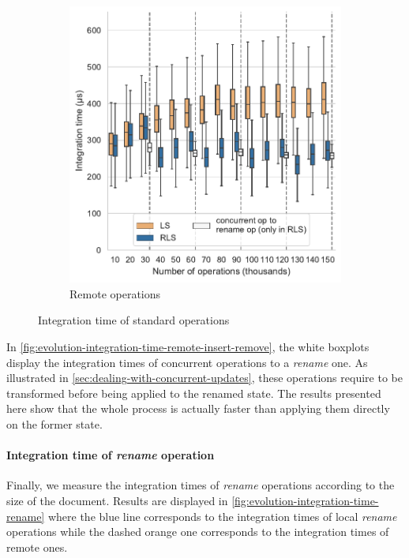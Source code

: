 \documentclass[sigplan,10pt,authorversion]{acmart}
\begin{document}
\begin{figure}[ht!]
\begin{subfigure}{\columnwidth}
        \includegraphics[width=0.9\columnwidth]{img/integration-time-boxplot-remote-operations-without-outliers.pdf}
        \caption{Remote operations}
        \label{fig:evolution-integration-time-remote-insert-remove}
    \end{subfigure}
    \caption{Integration time of standard operations}
    \label{fig:evolution-integration-time-insert-remove}
\end{figure}

In \autoref{fig:evolution-integration-time-remote-insert-remove}, the white boxplots display the integration times of concurrent operations to a \emph{rename} one.
As illustrated in \autoref{sec:dealing-with-concurrent-updates}, these operations require to be transformed before being applied to the renamed state.
The results presented here show that the whole process is actually faster than applying them directly on the former state.

\paragraph{Integration time of \emph{rename} operation}

Finally, we measure the integration times of \emph{rename} operations according to the size of the document.
Results are displayed in \autoref{fig:evolution-integration-time-rename} where the blue line corresponds to the integration times of local \emph{rename} operations while the dashed orange one corresponds to the integration times of remote ones.
\end{document}
